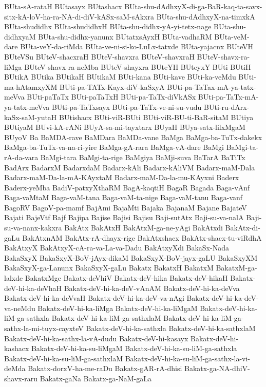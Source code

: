 {BUta-sA-rataH
BUtasayx
BUtashacx
BUta-shu-dAdhxyX-di-ga-BaR-kaq-ta-savx-sitx-kA-loV-ha-ra-NA-di-diV-kASx-saM-sAkxra
BUta-shu-dAdhxyX-na-timxkA
BUta-shudidhx
BUta-shudidhxH
BUta-shu-didhx-yA-yi-tetx-nage
BUta-shu-didhxyaM
BUta-shu-didhx-yanunx
BUtatxsAyxH
BUta-vadhaRM
BUta-veM-dare
BUta-veY-da-riMda
BUta-ve-ni-si-ko-LuLx-tatxde
BUta-yajacnx
BUteVH
BUteVSu
BUteV-shacxraH
BUteV-shavxra
BUteV-shavxraH
BUteV-shavx-ra-liMga
BUteV-shavx-ra-neMba
BUteV-shayxra
BUteYH
BUteyxY
BUti
BUtiH
BUtikA
BUtika
BUtikaH
BUtikaM
BUti-kana
BUti-kave
BUti-ka-veMdu
BUti-ma-hAtamxyXM
BUti-pa-TATx-Kayx-diV-kaSxyA
BUti-pa-TaTax-mA-ya-tatx-meVva
BUti-paTaTx
BUti-paTaTxH
BUti-pa-TaTx-diVkASx
BUti-pa-TaTx-mA-ya-tatx-meVva
BUti-pa-TaTxsayx
BUti-pa-TaTx-ve-ni-su-vudu
BUti-ru-dArx-kaSx-saM-yutaH
BUtishacx
BUti-viR-BUti
BUti-viR-BU-ti-BaR-sitaM
BUtiya
BUtiyaM
BUvi-kA-rANi
BUyA-sa-mi-tayxtarx
BUyaH
BUya-satx-lilxMgaM
BUyoV
Ba
BaMDA-rave
BaMDara
BaMDa-vane
BaMga
BaMga-ba-TuTx-dakekx
BaMga-ba-TuTx-va-na-ri-yire
BaMga-gA-rara
BaMga-vA-dare
BaMgi
BaMgi-ta-rA-da-vara
BaMgi-tara
BaMgi-ta-rige
BaMgiya
BaMji-suva
BaTarA
BaTiTx
BadArx
BadarxM
BadarxdaM
Badarx-kAli
Badarx-kAliVM
Badarx-maM-Dala
Badarx-maM-Da-la-mA-KAyxtaM
Badarx-maM-Da-la-mu-KAyxni
Baderx
Baderx-yeMba
BadiV-patxyXthaRM
BagA-kaqtiH
BagaR
Bagada
Baga-vAnf
Baga-vaMtaM
Baga-vaM-tana
Baga-vaM-ta-nige
Baga-vaM-tanu
Baga-vanf
BagoRV
BagoV-pa-mamf
BajAmi
BajaMti
Bajaka
BajanaM
Bajane
BajateV
Bajati
BajeVtf
Bajf
Bajipa
Bajise
Bajisi
Bajisu
Baji-sutAtx
Baji-su-va-nalA
Baji-su-va-nanx-kakxra
BakAtx
BakAtxH
BakAtxM-ga-ne-yAgi
BakAtxdi
BakAtx-di-gaLu
BakAtxnAM
BakAtx-rA-dhayx-rige
BakAtxshacx
BakAtx-shacx-tu-viRdhA
BakAtxyX
BakAtxyX-cA-ra-va-La-va-Dadu
BakAtxyXdi
BakaSx-Nada
BakaSxyX
BakaSxyX-BoV-jAyx-dikaM
BakaSxyX-BoV-jayx-gaLU
BakaSxyXM
BakaSxyX-ga-Lanunx
BakaSxyX-gaLu
Bakatx
BakatxH
BakatxM
BakatxM-ga-lalxde
BakatxMge
Bakatx-deVhiV
Bakatx-deV-hika
Bakatx-deV-hikaH
Bakatx-deV-hi-ka-deVhaH
Bakatx-deV-hi-ka-deV-vAnAM
Bakatx-deV-hi-ka-deVva
Bakatx-deV-hi-ka-deVvaH
Bakatx-deV-hi-ka-deV-va-nAgi
Bakatx-deV-hi-ka-deV-va-neMdu
Bakatx-deV-hi-ka-liMga
Bakatx-deV-hi-ka-liMgaM
Bakatx-deV-hi-ka-liM-ga-sathxla
Bakatx-deV-hi-ka-liM-ga-sathxlaM
Bakatx-deV-hi-ka-liM-ga-sathx-la-mi-tuyx-cayxteV
Bakatx-deV-hi-ka-sathxla
Bakatx-deV-hi-ka-sathxlaM
Bakatx-deV-hi-ka-sathx-la-vA-dudu
Bakatx-deV-hi-kasayx
Bakatx-deV-hi-kashacx
Bakatx-deV-hi-ka-su-liMgaM
Bakatx-deV-hi-ka-su-liM-ga-sathxla
Bakatx-deV-hi-ka-su-liM-ga-sathxlaM
Bakatx-deV-hi-ka-su-liM-ga-sathx-la-vi-deMda
Bakatx-dorxV-ha-me-raDu
Bakatx-gAR-rA-dhisi
Bakatx-ga-NA-dhiV-shavx-raru
Bakatx-gaNa
Bakatx-ga-NaM-gaLa
}

